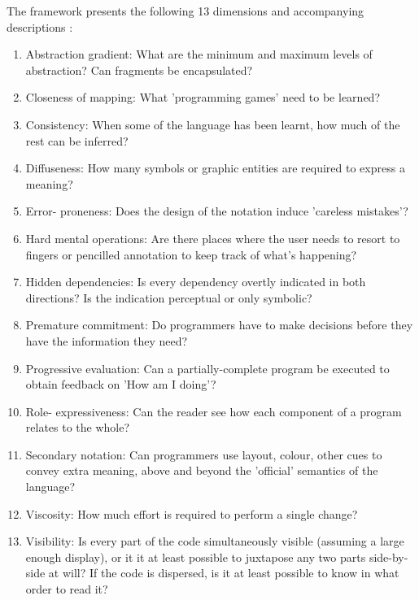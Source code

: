 The framework presents the following 13 dimensions and accompanying descriptions \cite[]{green_usability_1996}:
\begin{enumerate}
  \item Abstraction gradient: What are the minimum and maximum levels of abstraction? Can fragments be encapsulated? 

  \item Closeness of mapping: What 'programming games' need to be learned? 
  
  \item Consistency: When some of the language has been learnt, how much of the rest can be inferred? 
  
  \item Diffuseness: How many symbols or graphic entities are required to express a meaning? 
  
  \item Error- proneness: Does the design of the notation induce 'careless mistakes'? 
  
  \item Hard mental operations: Are there places where the user needs to resort to fingers or pencilled annotation to keep track of what's happening? 
  
  \item Hidden dependencies: Is every dependency overtly indicated in both directions? Is the indication perceptual or only symbolic? 
  
  \item Premature commitment: Do programmers have to make decisions before they have the information they need? 
  
  \item Progressive evaluation: Can a partially-complete program be executed to obtain feedback on 'How am I doing'? 
  
  \item Role- expressiveness: Can the reader see how each component of a program relates to the whole? 
  
  \item Secondary notation: Can programmers use layout, colour, other cues to convey extra meaning, above and beyond the 'official' semantics of the language? 
  
  \item Viscosity: How much effort is required to perform a single change? 
  
  \item Visibility: Is every part of the code simultaneously visible (assuming a large enough display), or it it at least possible to juxtapose any two parts side-by-side at will? If the code is dispersed, is it at least possible to know in what order to read it?
\end{enumerate}

